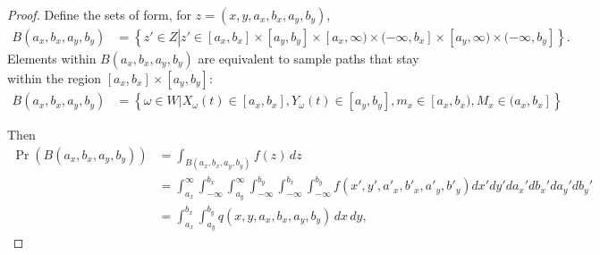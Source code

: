 \begin{proof}
  Define the sets of form, for $z = (x,y,a_x,b_x,a_y,b_y)$,
  \begin{align*}
    B(a_x, b_x, a_y, b_y) &= \left\{ z' \in Z \left| z' \in [a_x, b_x]
        \times [a_y, b_y] \times [a_x, \infty) \times (-\infty, b_x]
                            \times [a_y, \infty) \times (-\infty, b_y] \right.\right\}.
  \end{align*}
  Elements within $B(a_x, b_x, a_y, b_y)$ are equivalent to sample paths that stay within the region $[a_x, b_x] \times [a_y, b_y]$:
  \begin{align*}
    B(a_x, b_x, a_y, b_y) &= \left\{ \omega \in W | X_\omega(t) \in [a_x, b_x], Y_\omega(t) \in [a_y, b_y], m_x \in [a_x,b_x), M_x \in (a_x, b_x] \right\}
  \end{align*}

  Then
  \begin{align}
    \Pr(B(a_x, b_x, a_y, b_y)) &= \displaystyle \int_{B(a_x, b_x, a_y, b_y)} f(z)\, dz \nonumber \\ 
                               &= \displaystyle \int_{a_x}^{\infty} \displaystyle \int_{-\infty}^{b_x} \displaystyle \int_{a_y}^{\infty} \displaystyle \int_{-\infty}^{b_y} \displaystyle \int_{-\infty}^{b_x} \displaystyle \int_{-\infty}^{b_y} f(x', y', a'_x, b'_x, a'_y, b'_y) dx' dy' da_x' db_x' da_y' db_y' \label{eq:full-form} \\
                               &= \displaystyle \int_{a_x}^{b_x} \displaystyle \int_{a_y}^{b_y} q(x,y,a_x,b_x,a_y,b_y)\, dx\, dy, \nonumber
  \end{align}
  

\end{proof}
